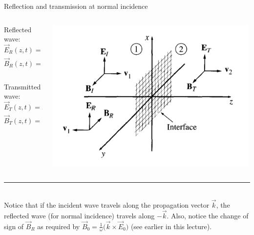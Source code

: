 \begin{frame}{Reflection and transmission at normal incidence}

\begin{columns}
  \begin{column}{0.40\textwidth}
     Reflected wave:
     \begin{equation*}
          \vec{E}_R (z,t) = {E_R}_0  e^{i (-k_1 z-\omega t)}  \hat{x}
      \end{equation*}
     \begin{equation*}
          \vec{B}_R (z,t) = -\frac{{E_R}_0}{u_1}  e^{i (-k_1 z-\omega t)} \hat{y}
      \end{equation*}\\
      \vspace{0.4cm}
      Transmitted wave:
      \begin{equation*}
           \vec{E}_T (z,t) = {E_T}_0  e^{i ( k_2 z-\omega t)}  \hat{x}
       \end{equation*}
      \begin{equation*}
           \vec{B}_T (z,t) = \frac{{E_T}_0}{u_2}  e^{i (k_2 z-\omega t)} \hat{y}
       \end{equation*}
  \end{column}
  \begin{column}{0.60\textwidth}
    \begin{center}
      \includegraphics[width=0.99\textwidth]{./images/schematics/wave_reflection_transmission_normal_incidence_2.png}\\
    \end{center}
  \end{column}
\end{columns}

\vspace{0.4cm}

\noindent\rule{2cm}{0.4pt}\\
{\scriptsize
  Notice that if the incident wave travels along the propagation vector $\vec{k}$,
  the reflected wave (for normal incidence) travels along $-\vec{k}$.
  Also, notice the change of sign of $\vec{B}_R$
  as required by $\displaystyle \vec{B}_{0} = \frac{1}{\omega} \Big( \vec{k} \times \vec{E}_0 \Big)$
  (see earlier in this lecture).\\
}

\end{frame}

